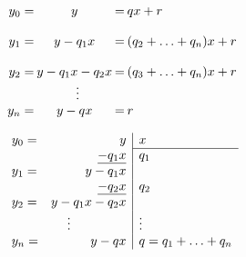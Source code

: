 \begin{TFGampliado}
\begin{prop}
    \begin{center}
        \vspace{-25pt}
        \begin{minipage}[t]{0.45\textwidth}
        \[{
        \addtolength{\arraycolsep}{-4pt}  %
        \begin{array}{rcrl}
            y_0 =& y &=&qx + r \\
            \\
            y_1 =& y - q_1x &= &(q_2 + \ldots + q_n)x + r \\
            \\ 
            y_2 =& y - q_1x -q_2x&= &(q_3 + \ldots + q_n)x + r \\
           & \ \, \vdots& \\
            y_n =&  y - qx &=& r
        \end{array}
        }\]
    
        \end{minipage}
        \hfill
        \begin{minipage}[t]{0.45\textwidth}
        \[{
        \begin{array}{lr|l}
            y_0 =&y & x \\\cline{3-3} 
            &\underline{- q_1x} & q_1\\
            y_1 =& y - q_1x & \\
            &\underline{- q_2x} & q_2\\
            y_2 =& y - q_1x - q_2x & \\
            \multicolumn{2}{c|}{\vdots} & \vdots\\
            y_n =& y - qx & q = q_1 + \ldots + q_n
        \end{array}
        }\]
        \end{minipage}
    \end{center}
    \smallskip
\end{prop}
\end{TFGampliado}


